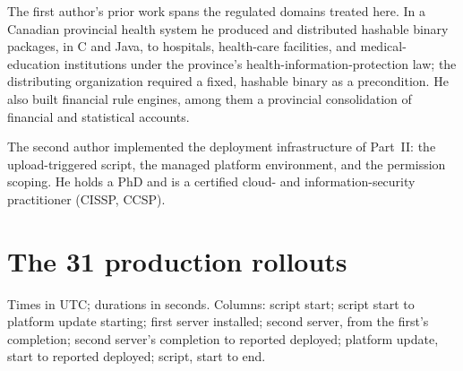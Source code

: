 \documentclass[11pt]{article}
\begin{document}
The first author's prior work spans the regulated domains treated here. In a Canadian provincial health system he produced and distributed hashable binary packages, in C and Java, to hospitals, health-care facilities, and medical-education institutions under the province's health-information-protection law; the distributing organization required a fixed, hashable binary as a precondition. He also built financial rule engines, among them a provincial consolidation of financial and statistical accounts.

The second author implemented the deployment infrastructure of Part~II: the upload-triggered script, the managed platform environment, and the permission scoping. He holds a PhD and is a certified cloud- and information-security practitioner (CISSP, CCSP).

\appendix
\section{The 31 production rollouts}

Times in UTC; durations in seconds. Columns: script start; script start to platform update starting; first server installed; second server, from the first's completion; second server's completion to reported deployed; platform update, start to reported deployed; script, start to end.
\end{document}
